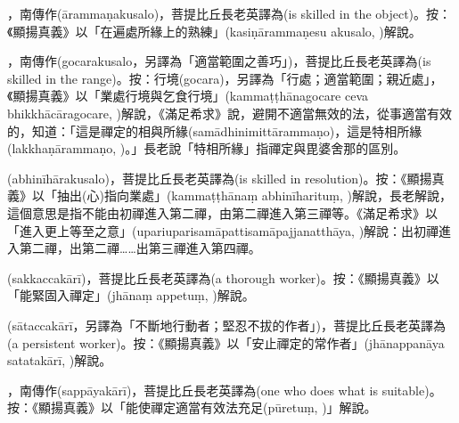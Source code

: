 \startitemgroup[noteitems]
\item{}，南傳作(ārammaṇakusalo)，菩提比丘長老英譯為(is skilled in the object)。按：《顯揚真義》以「在遍處所緣上的熟練」(kasiṇārammaṇesu akusalo, )解說。
\stopitemgroup

\startitemgroup[noteitems]
\item{}，南傳作(gocarakusalo，另譯為「適當範圍之善巧」)，菩提比丘長老英譯為(is skilled in the range)。按：行境(gocara)，另譯為「行處；適當範圍；親近處」，《顯揚真義》以「業處行境與乞食行境」(kammaṭṭhānagocare ceva bhikkhācāragocare, )解說，《滿足希求》說，避開不適當無效的法，從事適當有效的，知道：「這是禪定的相與所緣(samādhinimittārammaṇo)，這是特相所緣(lakkhaṇārammaṇo, )。」長老說「特相所緣」指禪定與毘婆舍那的區別。
\stopitemgroup

\startitemgroup[noteitems]
\item{}(abhinīhārakusalo)，菩提比丘長老英譯為(is skilled in resolution)。按：《顯揚真義》以「抽出(心)指向業處」(kammaṭṭhānaṃ abhinīharituṃ, )解說，長老解說，這個意思是指不能由初禪進入第二禪，由第二禪進入第三禪等。《滿足希求》以「進入更上等至之意」(upariuparisamāpattisamāpajjanatthāya, )解說：出初禪進入第二禪，出第二禪……出第三禪進入第四禪。
\stopitemgroup

\startitemgroup[noteitems]
\item{}(sakkaccakārī)，菩提比丘長老英譯為(a thorough worker)。按：《顯揚真義》以「能緊固入禪定」(jhānaṃ appetuṃ, )解說。
\stopitemgroup

\startitemgroup[noteitems]
\item{}(sātaccakārī，另譯為「不斷地行動者；堅忍不拔的作者」)，菩提比丘長老英譯為(a persistent worker)。按：《顯揚真義》以「安止禪定的常作者」(jhānappanāya satatakārī, )解說。
\stopitemgroup

\startitemgroup[noteitems]
\item{}，南傳作(sappāyakārī)，菩提比丘長老英譯為(one who does what is suitable)。按：《顯揚真義》以「能使禪定適當有效法充足(pūretuṃ, )」解說。
\stopitemgroup

